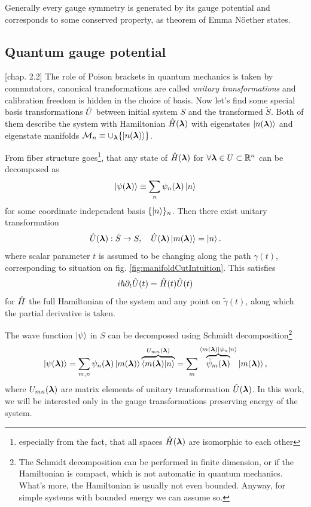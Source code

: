 Generally every gauge symmetry is generated by its gauge potential and corresponds to some conserved property, as theorem of Emma Nöether states.



\subsection{Quantum gauge potential}
\citep{kolodrubez}[chap. 2.2]
The role of Poison brackets in quantum mechanics is taken by commutators, canonical transformations are called \emph{unitary transformations} and calibration freedom is hidden in the choice of basis. Now let's find some special basis transformations $\hat{U}$ between initial system $S$ and the transformed $\tilde{S}$. Both of them describe the system with Hamiltonian $\hat{H}({\bm\lambda})$ with eigenstates $\ket{n({\bm\lambda})}$ and eigenstate manifolds $\mathcal{M}_n\equiv \cup_{\bm\lambda} \{\ket{n({\bm\lambda})}\}$. 

From fiber structure goes\footnote{especially from the fact, that all spaces $\hat{H}({\bm\lambda})$ are isomorphic to each other}, that any state of $\hat{H}({\bm\lambda})$ for $\forall {\bm\lambda}\in U\subset \mathbb{R}^n$ can be decomposed as
    \begin{equation}
    \ket{\psi({\bm\lambda})}\equiv \sum_n \psi_n({\bm\lambda})\ket{n}
\end{equation}    
for some coordinate independent basis $\{\ket{n}\}_n$.
Then there exist unitary transformation
\begin{equation}
    \hat{U}({\bm\lambda}): \tilde S\rightarrow S,\quad \hat{U}({\bm\lambda})\ket{m({\bm\lambda})}=\ket{n}.
    \label{eq:transformationU}
\end{equation}
where scalar parameter $t$ is assumed to be changing along the path $\gamma(t)$, corresponding to situation on fig. \ref{fig:manifoldCutIntuition}. This satisfies
\begin{equation}
    i\hbar \partial_t \hat{U}(t)=\hat{H}(t)\hat{U}(t)
    \label{eq:schrodingerForU}
\end{equation}
for $\hat{H}$ the full Hamiltonian of the system and any point on $\tilde\gamma(t)$, along which the partial derivative is taken.


The wave function $\ket{\psi}$ in $S$ can be decomposed using Schmidt decomposition\footnote{The Schmidt decomposition can be performed in finite dimension, or if the Hamiltonian is compact, which is not automatic in quantum mechanics. What's more, the Hamiltonian is usually not even bounded. Anyway, for simple systems with bounded energy we can assume so.}
\begin{equation}
    \ket{\psi({\bm\lambda})} = \sum_{m,n}\psi_n({\bm\lambda}) \ket{m({\bm\lambda})}\overbrace{\braket{m({\bm\lambda})|n}}^{U_{mn}({\bm\lambda})} =\sum_m \overbrace{\tilde{\psi}_m({\bm\lambda})}^{\braket{m({\bm\lambda})|\psi_n|n}}\ket{m({\bm\lambda})},
\end{equation}
where $U_{mn}({\bm\lambda})$ are matrix elements of unitary transformation $\hat{U}({\bm\lambda})$. In this work, we will be interested only in the gauge transformations preserving energy of the system.


